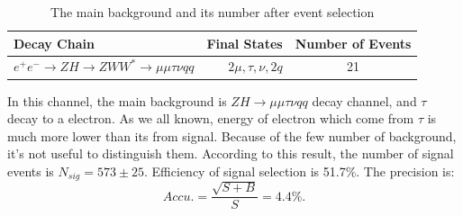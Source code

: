 \documentclass[11pt,a4paper]{cepcnote}
\begin{document}
\begin{table}[H]
	\begin{center}
		\begin{tabular}{lrc}
			\hline\hline
			Decay Chain	& Final States 	&	Number of Events	\\
			\hline
			$e^+e^-\to ZH \to ZWW^* \to \mu\mu\tau\nu qq $ 		& $2\mu, \tau, \nu, 2q$		&	21\\
			\hline\hline
		\end{tabular}
		\caption[]{The main background and its number after event selection}
		\label{tab:bkginuuevqq}
	\end{center}
\end{table}
In this channel, the main background is $ZH \to \mu\mu\tau\nu qq$ decay channel, and $\tau$ decay to a electron. 
As we all known, energy of electron which come from $\tau$ is much more lower than its from signal. 
Because of the few number of background, it's not useful to distinguish them. 
According to this result, the number of signal events is $N_{sig} = 573\pm 25$. Efficiency of signal selection is 51.7\%. 
The precision is:
\begin{equation*}
	Accu. = \frac{\sqrt{S+B}}{S} = 4.4\%.
\end{equation*}
\end{document}
